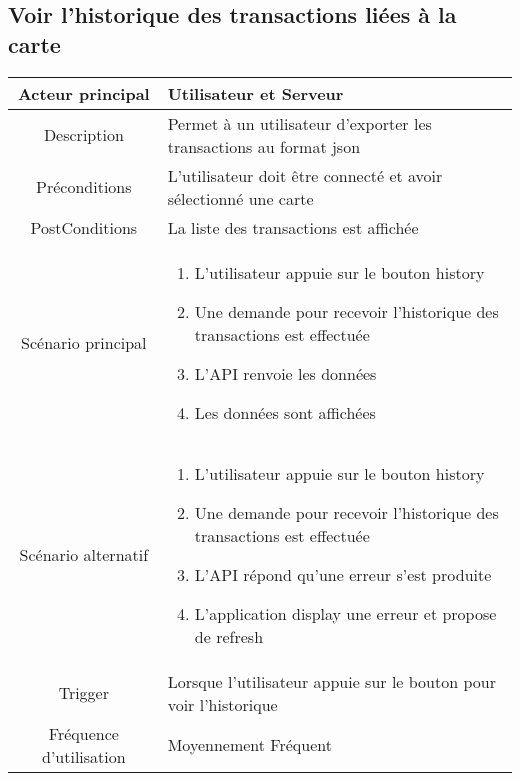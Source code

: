 \documentclass{article}
\begin{document}
\subsection{Voir l'historique des transactions liées à la carte}
    \begin{table}[h]
        \begin{tabular}{|c|p{10cm}|}
        \hline
        Acteur principal& Utilisateur et Serveur    \\
        \hline
        Description&  Permet à un utilisateur d'exporter les transactions au format json  \\
        \hline
        Préconditions& L'utilisateur doit être connecté et avoir sélectionné une carte \\
        \hline
        PostConditions&  La liste des transactions est affichée   \\
        \hline
        Scénario principal& 
                \begin{enumerate}
                    \item L'utilisateur appuie sur le bouton history
                    \item Une demande pour recevoir l'historique des transactions est effectuée
                    \item L'API renvoie les données
                    \item Les données sont affichées
                \end{enumerate}     \\
        \hline
        Scénario alternatif&  
            \begin{enumerate}
                \item L'utilisateur appuie sur le bouton history
                \item Une demande pour recevoir l'historique des transactions est effectuée
                \item L'API répond qu'une erreur s'est produite
                \item L'application display une erreur et propose de refresh
            \end{enumerate}     \\
        \hline
        Trigger&   Lorsque l'utilisateur appuie sur le bouton pour voir l'historique  \\
        \hline
        Fréquence d'utilisation&  Moyennement Fréquent  \\
        \hline
        \end{tabular}
    \end{table}
\end{document}
